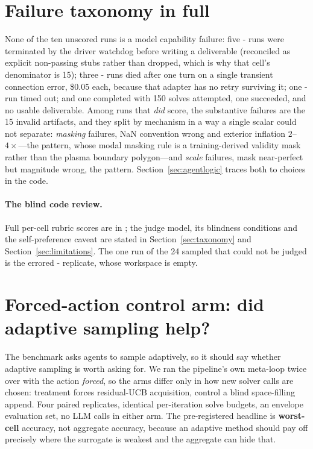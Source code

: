 \section{Failure taxonomy in full}
\label{app:taxonomy}

None of the ten unscored runs is a model capability failure: five
\Ltwo{}- runs were terminated by the driver watchdog before writing a
deliverable (reconciled as explicit non-passing stubs rather than dropped, which
is why that cell's denominator is 15); three \Ltwo{}- runs died after
one turn on a single transient connection error, \$0.05 each, because that
adapter has no retry surviving it; one \Lthree{}- run timed out; and one
completed with 150 solves attempted, one succeeded, and no usable deliverable.
Among runs that \emph{did} score, the substantive failures are the 15 invalid
artifacts, and they split by mechanism in a way a single scalar could not
separate: \emph{masking} failures, NaN convention wrong and exterior inflation
$2$--$4\times$---the  pattern, whose modal masking rule is a
training-derived validity mask rather than the plasma boundary polygon---and
\emph{scale} failures, mask near-perfect but magnitude wrong, the 
pattern. Section~\ref{sec:agentlogic} traces both to choices in the code.

\paragraph{The blind code review.}
Full per-cell rubric scores are in
; the judge model, its blindness
conditions and the self-preference caveat are stated in
Section~\ref{sec:taxonomy} and Section~\ref{sec:limitations}. The one run of the
24 sampled that could not be judged is the errored \Ltwo{}- replicate,
whose workspace is empty.

\section{Forced-action control arm: did adaptive sampling help?}
\label{app:controlarm}

The benchmark asks agents to sample adaptively, so it should say whether adaptive
sampling is worth asking for. We ran the pipeline's own meta-loop twice over with
the action \emph{forced}, so the arms differ only in how new solver calls are
chosen: treatment forces residual-UCB acquisition, control a blind space-filling
append. Four paired replicates, identical per-iteration solve budgets, an
envelope evaluation set, no LLM calls in either arm. The pre-registered headline
is \textbf{worst-cell} accuracy, not aggregate accuracy, because an adaptive
method should pay off precisely where the surrogate is weakest and the aggregate
can hide that.

